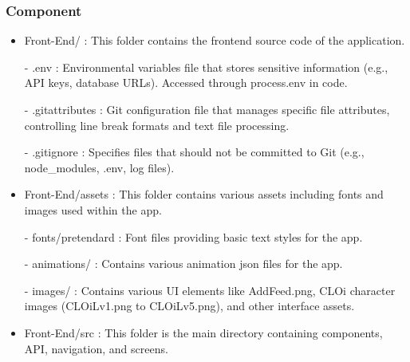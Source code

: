             \subsubsection{Component}
                \begin{itemize}
                    \item Front-End/ : This folder contains the frontend source code of the application.
                        \item[-] .env : Environmental variables file that stores sensitive information (e.g., API keys, database URLs). Accessed through process.env in code.
                        \item[-] .gitattributes : Git configuration file that manages specific file attributes, controlling line break formats and text file processing.
                        \item[-] .gitignore : Specifies files that should not be committed to Git (e.g., node_modules, .env, log files).
                    \vspace{3mm}
                    
                    \item Front-End/assets : This folder contains various assets including fonts and images used within the app.
                        \item[-] fonts/pretendard : Font files providing basic text styles for the app.
                        \item[-] animations/ : Contains various animation json files for the app.
                        \item[-] images/ : Contains various UI elements like AddFeed.png, CLOi character images (CLOiLv1.png to CLOiLv5.png), and other interface assets.
                    \vspace{3mm}
                    
                    \item Front-End/src : This folder is the main directory containing components, API, navigation, and screens.
                    \vspace{3mm}
                    

\end{itemize}
